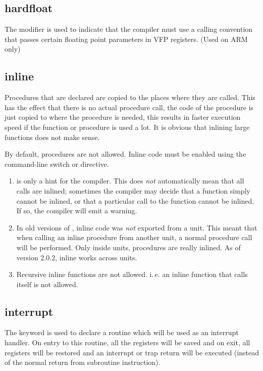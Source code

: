 \subsection{hardfloat}
The  modifier is used to indicate that the compiler must
use a calling convention that passes certain floating point parameters in VFP registers.
(Used on ARM only)

\subsection{inline}
\label{se:inline}
Procedures that are declared  are copied to the places where they
are called. This has the effect that there is no actual procedure call,
the code of the procedure is just copied to where the procedure is needed,
this results in faster execution speed if the function or procedure is
used a lot. It is obvious that inlining large functions does not make sense.

By default,  procedures are not allowed. Inline code must be enabled
using the command-line switch  or 
directive.

\begin{remark}
\begin{enumerate}
\item {} is only a hint for the compiler. This does {\em not}
automatically mean that all calls are inlined; sometimes the compiler
may decide that a function simply cannot be inlined, or that a particular call
to the function cannot be inlined. If so, the compiler will emit a warning.
\item In old versions of \fpc, inline code was {\em not} exported from a unit. This
meant that when calling an inline procedure from another unit, a normal procedure
call will be performed. Only inside units,  procedures are really inlined.
As of version 2.0.2, inline works across units.
\item Recursive inline functions are not allowed. i.\,e. an inline function
that calls itself is not allowed.
\end{enumerate}
\end{remark}

\subsection{interrupt}
\label{se:interrupt}
The  keyword is used to declare a routine which will
be used as an interrupt handler. On entry to this routine, all the registers
will be saved and on exit, all registers will be restored
and an interrupt or trap return will be executed (instead of the normal return
from subroutine instruction).

